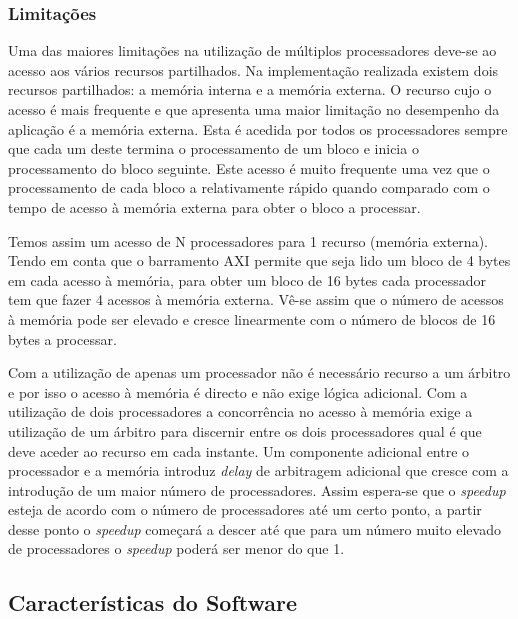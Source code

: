 \subsubsection{Limitações} 

Uma das maiores limitações na utilização de múltiplos processadores deve-se ao acesso aos vários recursos partilhados. Na implementação realizada existem dois recursos partilhados: a memória interna e a memória externa. O recurso cujo o acesso é mais frequente e que apresenta uma maior limitação no desempenho da aplicação é a memória externa. Esta é acedida por todos os processadores sempre que cada um deste termina o processamento de um bloco e inicia o processamento do bloco seguinte. Este acesso é muito frequente uma vez que o processamento de cada bloco a relativamente rápido quando comparado com o tempo de acesso à memória externa para obter o bloco a processar.

Temos assim um acesso de N processadores para 1 recurso (memória externa). Tendo em conta que o barramento AXI permite que seja lido um bloco de 4 bytes em cada acesso à memória, para obter um bloco de 16 bytes cada processador tem que fazer 4 acessos à memória externa. Vê-se assim que o número de acessos à memória pode ser elevado e cresce linearmente com o número de blocos de 16 bytes a processar.

Com a utilização de apenas um processador não é necessário recurso a um árbitro e por isso o acesso à memória é directo e não exige lógica adicional. Com a utilização de dois processadores a concorrência no acesso à memória exige a utilização de um árbitro para discernir entre os dois processadores qual é que deve aceder ao recurso em cada instante. Um componente adicional entre o processador e a memória introduz \textit{delay} de arbitragem adicional que cresce com a introdução de um maior número de processadores. Assim espera-se que o \textit{speedup} esteja de acordo com o número de processadores até um certo ponto, a partir desse ponto o \textit{speedup} começará a descer até que para um número muito elevado de processadores o \textit{speedup} poderá ser menor do que 1.

\subsection{Características do Software}
